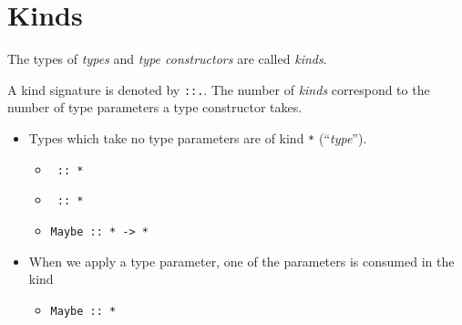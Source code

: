 \section{Kinds}

The types of \textit{types} and \textit{type constructors} are called \textit{kinds}.

A kind signature is denoted by \texttt{::.}. The number of \textit{kinds} correspond to the number of type parameters a type constructor takes.
\begin{itemize}
  \item Types which take no type parameters are of kind \texttt{*} (``\textit{type}'').
  \begin{itemize}
    \item \texttt{ :: *}
    \item \texttt{ :: *}
    \item \texttt{Maybe :: * -> *}
  \end{itemize}
  \item When we apply a type parameter, one of the parameters is consumed in the kind
  \begin{itemize}
    \item \texttt{Maybe  :: *}
  \end{itemize}
\end{itemize}